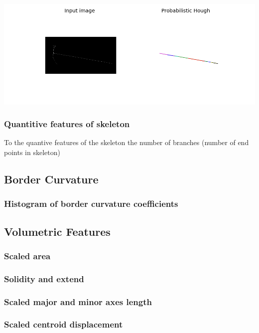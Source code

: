\documentclass[12pt]{article}
\begin{document}
\includegraphics[scale=0.6]{hammer_604.png}

\subsubsection{Quantitive features of skeleton}
To the quantive features of the skeleton the number of branches (number of end points in skeleton)

\subsection{Border Curvature}
\subsubsection{Histogram of border curvature coefficients}

\subsection{Volumetric Features}
\subsubsection{Scaled area}
\subsubsection{Solidity and extend}
\subsubsection{Scaled major and minor axes length}
\subsubsection{Scaled centroid displacement}
\end{document}

